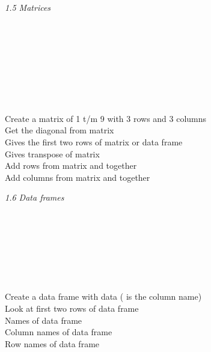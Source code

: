 \textit{1.5 Matrices} \\
\\
\begin{minipage}[t]{.4\textwidth}
\vspace*{-8pt}
 \\			
 \\		
 \\				
 \\			
 \\		
 \\		
\end{minipage}
\begin{minipage}[t]{.6\textwidth}
Create a matrix of 1 t/m 9 with 3 rows and 3 columns  \\
Get the diagonal from matrix  \\
Gives the first two rows of matrix or data frame  \\
Gives transpose of matrix  \\
Add rows from matrix  and  together \\
Add columns from matrix  and  together \\
\end{minipage}
\vspace*{.5cm}

\textit{1.6 Data frames} \\
\\
\begin{minipage}[t]{.4\textwidth}
\vspace*{-8pt}
 \\
 \\			
 \\				
 \\			
 \\
\end{minipage}
\begin{minipage}[t]{.6\textwidth}
Create a data frame with data  ( is the column name) \\
Look at first two rows of data frame  \\
Names of data frame  \\
Column names of data frame  \\
Row names of data frame  \\
\end{minipage}
\vspace*{.5cm}

